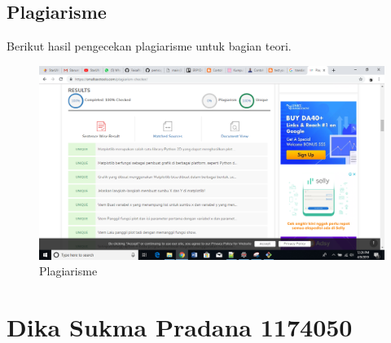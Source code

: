 \subsection{Plagiarisme}
Berikut hasil pengecekan plagiarisme untuk bagian teori.
\begin{figure}[H]
	\includegraphics[width=12cm]{figures/6/1174042/plagiat.png}
	\centering
	\caption{Plagiarisme}
\end{figure}

\section{Dika Sukma Pradana 1174050}
